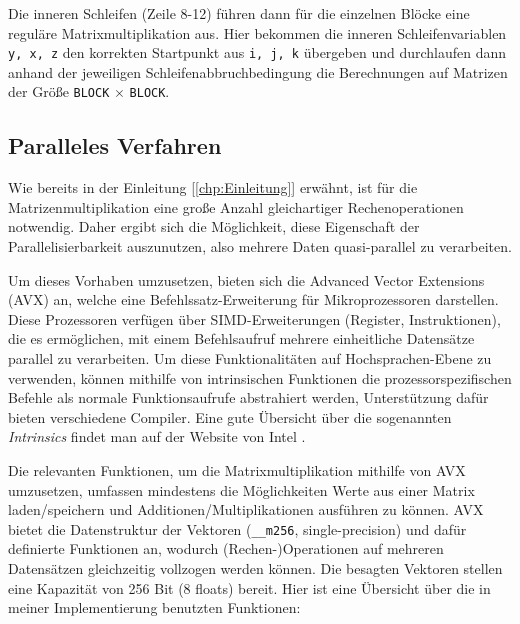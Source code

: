 \documentclass[a4paper,11pt]{scrartcl}
\begin{document}
Die inneren Schleifen (Zeile 8-12) führen dann für die einzelnen Blöcke eine reguläre 
Matrixmultiplikation aus. Hier bekommen die inneren Schleifenvariablen \texttt{y, x, z} den korrekten 
Startpunkt aus \texttt{i, j, k} übergeben und durchlaufen dann anhand der jeweiligen 
Schleifenabbruchbedingung die Berechnungen auf Matrizen der Größe \texttt{BLOCK} $\times$ \texttt{BLOCK}.

\subsection{Paralleles Verfahren}
Wie bereits in der Einleitung [\ref{chp:Einleitung}] erwähnt, ist für die 
Matrizenmultiplikation eine große Anzahl gleichartiger Rechenoperationen notwendig.
Daher ergibt sich die Möglichkeit, diese Eigenschaft der Parallelisierbarkeit auszunutzen,
also mehrere Daten quasi-parallel zu verarbeiten.\newline

Um dieses Vorhaben umzusetzen, bieten sich die Advanced Vector Extensions (AVX) an,
welche eine Befehlssatz-Erweiterung für Mikroprozessoren darstellen. Diese Prozessoren
verfügen über SIMD-Erweiterungen (Register, Instruktionen), die es ermöglichen, mit einem Befehlsaufruf  mehrere einheitliche Datensätze parallel zu verarbeiten. Um diese Funktionalitäten auf 
Hochsprachen-Ebene zu verwenden, können mithilfe von intrinsischen Funktionen 
die prozessorspezifischen Befehle als normale Funktionsaufrufe abstrahiert werden,
Unterstützung dafür bieten verschiedene Compiler. Eine gute Übersicht über die sogenannten
\emph{Intrinsics} findet man auf der Website von Intel \cite{intr}.\newline

Die relevanten Funktionen, um die Matrixmultiplikation mithilfe von AVX umzusetzen,
umfassen mindestens die Möglichkeiten Werte aus einer Matrix laden/speichern
und Additionen/Multiplikationen ausführen zu können. 
AVX bietet die Datenstruktur der Vektoren (\texttt{\_\_m256}, single-precision) und dafür definierte Funktionen an, wodurch (Rechen-)Operationen auf mehreren Datensätzen gleichzeitig
vollzogen werden können.
Die besagten Vektoren stellen eine Kapazität von 256 Bit (8 floats) bereit.
Hier ist eine Übersicht über die in meiner Implementierung benutzten Funktionen:\newline
\end{document}
